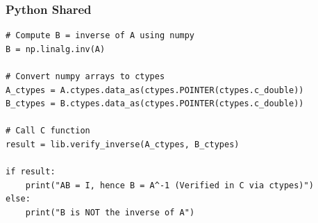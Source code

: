 \documentclass{beamer}
\begin{document}
\begin{frame}[fragile]
\frametitle{Python Shared}
\begin{lstlisting}
# Compute B = inverse of A using numpy
B = np.linalg.inv(A)

# Convert numpy arrays to ctypes
A_ctypes = A.ctypes.data_as(ctypes.POINTER(ctypes.c_double))
B_ctypes = B.ctypes.data_as(ctypes.POINTER(ctypes.c_double))

# Call C function
result = lib.verify_inverse(A_ctypes, B_ctypes)

if result:
    print("AB = I, hence B = A^-1 (Verified in C via ctypes)")
else:
    print("B is NOT the inverse of A")
\end{lstlisting}
\end{frame}
\end{document}
